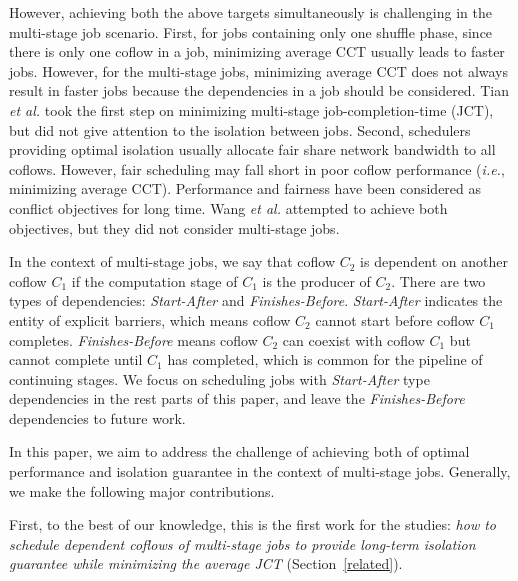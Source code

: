 \documentclass[10pt,journal,compsoc]{IEEEtran}
\begin{document}
However, achieving both the above targets simultaneously is challenging in the multi-stage job scenario.
%
First, for jobs containing only one shuffle phase, since there is only one coflow in a job, minimizing average CCT usually leads to faster jobs.
%
However, for the multi-stage jobs, minimizing average CCT does not always result in faster jobs because the dependencies in a job should be considered.
%
Tian \emph{et al.}\cite{bingchuan} took the first step on minimizing multi-stage job-completion-time (JCT), but did not give attention to the isolation between jobs.
%
Second, schedulers providing optimal isolation usually allocate fair share network bandwidth to all coflows. 
However, fair scheduling may fall short in poor coflow performance (\emph{i.e.}, minimizing average CCT)\cite{HUG}.
%
Performance and fairness have been considered as conflict objectives for long time.
%
Wang \emph{et al.}\cite{utopia} attempted to achieve both objectives, but they did not consider multi-stage jobs.

In the context of multi-stage jobs, we say that coflow $C_2$ is dependent on another coflow $C_1$ if the computation stage of $C_1$ is the producer of $C_2$.
%
There are two types of dependencies: \emph{Start-After} and \emph{Finishes-Before}.
%
\emph{Start-After} indicates the entity of explicit barriers\cite{aalo}, which means coflow $C_2$ cannot start before coflow $C_1$ completes.
%
\emph{Finishes-Before} means coflow $C_2$ can coexist with coflow $C_1$ but cannot complete until $C_1$ has completed, which is common for the pipeline of continuing stages\cite{dryad}.
%
We focus on scheduling jobs with \emph{Start-After} type dependencies in the rest parts of this paper, and leave the \emph{Finishes-Before} dependencies to future work.

In this paper, we aim to address the challenge of achieving both of optimal performance and isolation guarantee in the context of multi-stage jobs.
%
Generally, we make the following major contributions.

First, to the best of our knowledge, this is the first work for the studies: \emph{how to schedule dependent coflows of multi-stage jobs to provide long-term isolation guarantee while minimizing the average JCT} (Section~\ref{related}).
\end{document}
